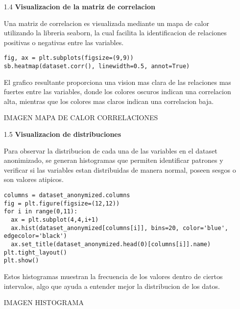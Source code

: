 \documentclass{article}
\begin{document}
\bigskip

\begin{itemize}

\item[1.4]  {\bf Visualizacion de la matriz de correlacion}

Una matriz de correlacion es visualizada mediante un mapa de calor utilizando la libreria seaborn, la cual facilita la identificacion de relaciones positivas o negativas entre las variables.

\begin{tcolorbox}[width=14cm]
\begin{scriptsize}
\begin{verbatim}
fig, ax = plt.subplots(figsize=(9,9))
sb.heatmap(dataset.corr(), linewidth=0.5, annot=True)
\end{verbatim}
\end{scriptsize}
\end{tcolorbox}

El grafico resultante proporciona una vision mas clara de las relaciones mas fuertes entre las variables, donde los colores oscuros indican una correlacion alta, mientras que los colores mas claros indican una correlacion baja.

IMAGEN MAPA DE CALOR CORRELACIONES

\end{itemize}

\bigskip

\begin{itemize}

\item[1.5]  {\bf Visualizacion de distribuciones}

Para observar la distribucion de cada una de las variables en el dataset anonimizado, se generan histogramas que permiten identificar patrones y verificar si las variables estan distribuidas de manera normal, poseen sesgos o son valores atipicos.

\begin{tcolorbox}[width=14cm]
\begin{scriptsize}
\begin{verbatim}
columns = dataset_anonymized.columns
fig = plt.figure(figsize=(12,12))
for i in range(0,11):
  ax = plt.subplot(4,4,i+1)
  ax.hist(dataset_anonymized[columns[i]], bins=20, color='blue', edgecolor='black')
  ax.set_title(dataset_anonymized.head(0)[columns[i]].name)
plt.tight_layout()
plt.show()
\end{verbatim}
\end{scriptsize}
\end{tcolorbox}

Estos histogramas muestran la frecuencia de los valores dentro de ciertos intervalos, algo que ayuda a entender mejor la distribucion de los datos.

IMAGEN HISTOGRAMA

\end{itemize}
\end{document}
